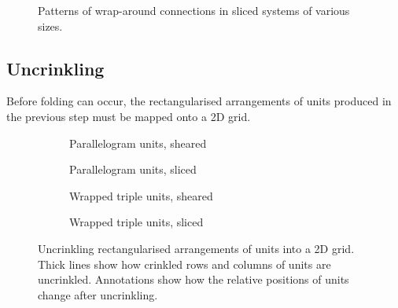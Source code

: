 			\begin{figure}
				\center
				\caption[Patterns of wrap-around connections in sliced systems.]%
				{Patterns of wrap-around connections in sliced systems of
				various sizes.}
				\label{fig:slicing-examples}
			\end{figure}
			
		\subsection{Uncrinkling}
			
			Before folding can occur, the rectangularised arrangements of units
			produced in the previous step must be mapped onto a 2D grid.
			
			\begin{figure}
				\center
				\begin{subfigure}[b]{0.48\linewidth}
					\center
					
					\caption{Parallelogram units, sheared}
					\label{fig:uncrinkling-node-sheared}
				\end{subfigure}
				\begin{subfigure}[b]{0.48\linewidth}
					\center
					
					\caption{Parallelogram units, sliced}
					\label{fig:uncrinkling-node-sliced}
				\end{subfigure}
				
				\vspace{1cm}
				
				\begin{subfigure}[b]{0.48\linewidth}
					\center
					
					\caption{Wrapped triple units, sheared}
					\label{fig:uncrinkling-sheared}
				\end{subfigure}
				\begin{subfigure}[b]{0.48\linewidth}
					\center
					
					\caption{Wrapped triple units, sliced}
					\label{fig:uncrinkling-sliced}
				\end{subfigure}
				
				\vspace{1em}
				
				\caption[Uncrinkling units into a 2D grid.]%
				{Uncrinkling rectangularised arrangements of units into a 2D
				grid. Thick lines show how crinkled rows and columns of units are
				uncrinkled.  Annotations show how the relative positions of units
				change after uncrinkling.}
				\label{fig:uncrinkling}
			\end{figure}
			

